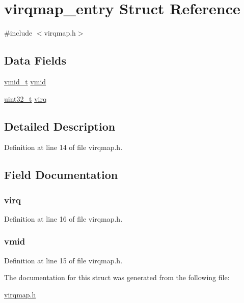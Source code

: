 \hypertarget{structvirqmap__entry}{\section{virqmap\-\_\-entry \-Struct \-Reference}
\label{structvirqmap__entry}
}


{\ttfamily \#include $<$virqmap.\-h$>$}

\subsection*{\-Data \-Fields}
\begin{DoxyCompactItemize}
\item 
\hyperlink{hvmm__types_8h_af7e9bd0adfb7d10e7a7a0ee60a5f962c}{vmid\-\_\-t} \hyperlink{structvirqmap__entry_a5aaea0584ec137718b51152ba747628b}{vmid}
\item 
\hyperlink{arch__types_8h_a435d1572bf3f880d55459d9805097f62}{uint32\-\_\-t} \hyperlink{structvirqmap__entry_a76a7da8e942ab20e51e638d71b9735db}{virq}
\end{DoxyCompactItemize}


\subsection{\-Detailed \-Description}


\-Definition at line 14 of file virqmap.\-h.



\subsection{\-Field \-Documentation}
\hypertarget{structvirqmap__entry_a76a7da8e942ab20e51e638d71b9735db}{
\subsubsection[{virq}]{ {\bf virq}}}\label{structvirqmap__entry_a76a7da8e942ab20e51e638d71b9735db}


\-Definition at line 16 of file virqmap.\-h.

\hypertarget{structvirqmap__entry_a5aaea0584ec137718b51152ba747628b}{
\subsubsection[{vmid}]{ {\bf vmid}}}\label{structvirqmap__entry_a5aaea0584ec137718b51152ba747628b}


\-Definition at line 15 of file virqmap.\-h.



\-The documentation for this struct was generated from the following file\-:\begin{DoxyCompactItemize}
\item 
\hyperlink{virqmap_8h}{virqmap.\-h}\end{DoxyCompactItemize}
